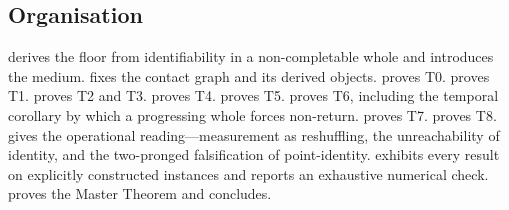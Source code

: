 \documentclass[11pt,a4paper]{article}
\theoremstyle{thmstyle}
\theoremstyle{definition}
\theoremstyle{remark}
\begin{document}
\subsection{Organisation}

 derives the floor from identifiability in a non-completable
whole and introduces the medium.  fixes the contact graph and
its derived objects.  proves T0.  proves T1.
 proves T2 and T3.  proves T4.
 proves T5.  proves T6, including the temporal
corollary by which a progressing whole forces non-return. 
proves T7.  proves T8.  gives the
operational reading---measurement as reshuffling, the unreachability of identity,
and the two-pronged falsification of point-identity. 
exhibits every result on explicitly constructed instances and reports an
exhaustive numerical check.  proves the Master Theorem and
concludes.
\end{document}
